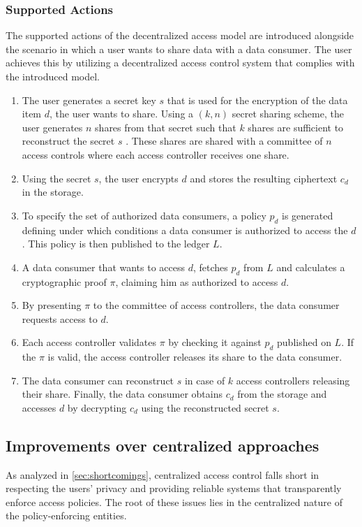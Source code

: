 \documentclass[conference]{IEEEtran}
\begin{document}
\subsubsection{Supported Actions}
\label{sec:supported_actions}
The supported actions of the decentralized access model are introduced alongside the scenario in which a user wants to share data with a data consumer.
The user achieves this by utilizing a decentralized access control system that complies with the introduced model.

\begin{enumerate}
  \item The user generates a secret key $s$ that is used for the encryption of the data item $d$, the user wants to share.
  Using a $(k,n)$ secret sharing scheme, the user generates $n$ shares from that secret such that $k$ shares are sufficient to reconstruct the secret $s$ \cite{shamir_how_1979}.
  These shares are shared with a committee of $n$ access controls where each access controller receives one share.
  \item Using the secret $s$, the user encrypts  $d$ and stores the resulting ciphertext $c_d$ in the storage.
  \item To specify the set of authorized data consumers, a policy $p_d$ is generated defining under which conditions a data consumer is authorized to access the $d$.
  This policy is then published to the ledger $L$.
  \item A data consumer that wants to access $d$, fetches $p_d$ from $L$ and calculates a cryptographic proof $\pi$, claiming him as authorized to access $d$.
  \item By presenting $\pi$ to the committee of access controllers, the data consumer requests access to $d$.
  \item Each access controller validates $\pi$ by checking it against $p_d$ published on $L$.
  If the $\pi$ is valid, the access controller releases its share to the data consumer.
  \item The data consumer can reconstruct $s$ in case of $k$ access controllers releasing their share.
  Finally, the data consumer obtains $c_d$ from the storage and accesses $d$ by decrypting $c_d$ using the reconstructed secret $s$. 
\end{enumerate}

\subsection{Improvements over centralized approaches}
As analyzed in \autoref{sec:shortcomings}, centralized access control falls short in respecting the users' privacy and providing reliable systems that transparently enforce access policies.
The root of these issues lies in the centralized nature of the policy-enforcing entities.
\end{document}
